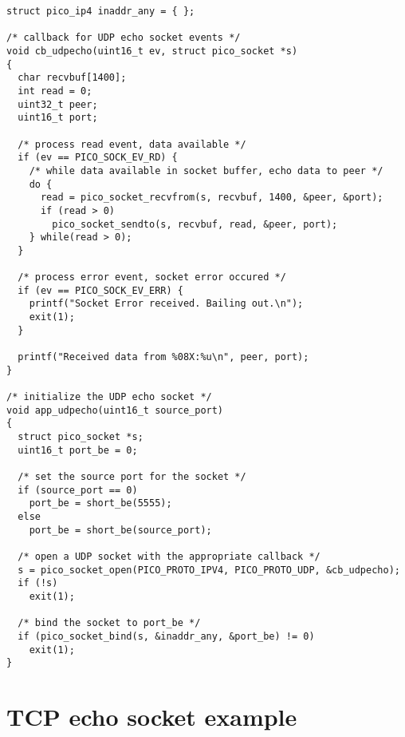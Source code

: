 \begin{verbatim}
struct pico_ip4 inaddr_any = { };

/* callback for UDP echo socket events */
void cb_udpecho(uint16_t ev, struct pico_socket *s)
{
  char recvbuf[1400];
  int read = 0;
  uint32_t peer;
  uint16_t port;

  /* process read event, data available */
  if (ev == PICO_SOCK_EV_RD) {
  	/* while data available in socket buffer, echo data to peer */
    do {
      read = pico_socket_recvfrom(s, recvbuf, 1400, &peer, &port);
      if (read > 0)
        pico_socket_sendto(s, recvbuf, read, &peer, port);
    } while(read > 0);
  }

  /* process error event, socket error occured */
  if (ev == PICO_SOCK_EV_ERR) {
    printf("Socket Error received. Bailing out.\n");
    exit(1);
  }

  printf("Received data from %08X:%u\n", peer, port);
}

/* initialize the UDP echo socket */
void app_udpecho(uint16_t source_port)
{
  struct pico_socket *s;
  uint16_t port_be = 0;
  
  /* set the source port for the socket */
  if (source_port == 0)
    port_be = short_be(5555);
  else
    port_be = short_be(source_port);

  /* open a UDP socket with the appropriate callback */
  s = pico_socket_open(PICO_PROTO_IPV4, PICO_PROTO_UDP, &cb_udpecho);
  if (!s)
    exit(1);

  /* bind the socket to port_be */
  if (pico_socket_bind(s, &inaddr_any, &port_be) != 0)
    exit(1);
}
\end{verbatim}


\section{TCP echo socket example}

